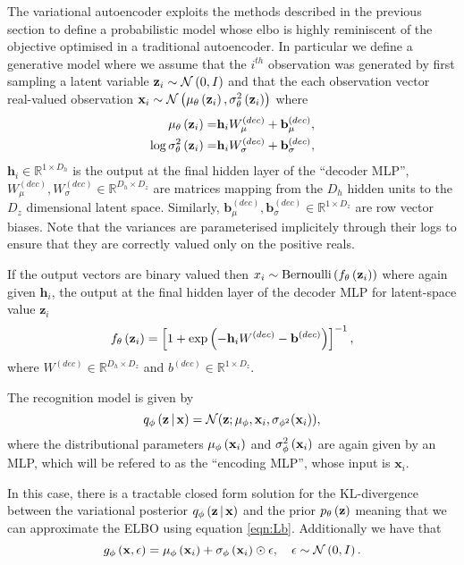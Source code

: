 \documentclass[../report.tex]{subfiles}
\begin{document}
The variational autoencoder exploits the methods described in the previous section to define a probabilistic model whose elbo is highly reminiscent of the objective optimised in a traditional autoencoder. In particular we define a generative model where we assume that the $i^{th}$ observation was generated by first sampling a latent variable $\mathbf{z}_i \sim \mathcal{N} \left( 0, I\right)$ and that the each observation vector real-valued observation $\mathbf{x}_i \sim \mathcal{N} \left( \mu_\theta \left( \mathbf{z}_i\right), \sigma^2_\theta \left( \mathbf{z}_i\right)\right)$ where
\begin{align}
  \mathbf{\mu}_\theta \left( \mathbf{z}_i\right) =& \mathbf{h}_i W_\mathbf{\mu}^{(dec)} + \mathbf{b}_\mathbf{\mu}^{(dec)}, \\
  \log \sigma^2_\theta \left( \mathbf{z}_i\right) =& \mathbf{h}_i W_\sigma^{(dec)} + \mathbf{b}_\sigma^{(dec)},
\end{align}
$\mathbf{h}_i \in \mathbb{R}^{1 \times D_h}$ is the output at the final hidden layer of the ``decoder MLP'', $W_\mu^{(dec)}, W_\sigma^{(dec)} \in \mathbb{R}^{D_h \times D_z}$ are matrices mapping from the $D_h$ hidden units to the $D_z$ dimensional latent space. Similarly, $\mathbf{b}_\mu^{(dec)}, \mathbf{b}_\sigma^{(dec)} \in \mathbb{R}^{1 \times D_z}$ are row vector biases. Note that the variances are parameterised implicitely through their logs to ensure that they are correctly valued only on the positive reals.

If the output vectors are binary valued then $x_i \sim \textrm{Bernoulli} \left( f_\theta \left( \mathbf{z}_i\right)\right)$ where again given $\mathbf{h}_i$, the output at the final hidden layer of the decoder MLP for latent-space value $\mathbf{z}_i$
\begin{equation}
  f_\theta \left( \mathbf{z}_i\right) = \left[1 + \exp \left( - \mathbf{h}_i W^{(dec)} - \mathbf{b}^{(dec)}\right) \right]^{-1},
\end{equation}
where $W^{(dec)} \in \mathbb{R}^{D_h \times D_z}$ and $b^{(dec)} \in \mathbb{R}^{1 \times D_z}$.

The recognition model is given by
\begin{equation}
  q_\phi \left(\mathbf{z} \, \middle\vert \, \mathbf{x} \right) = \mathcal{N}(\mathbf{z}; \mu_\phi, \mathbf{x}_i, \sigma_{\phi^2}(\mathbf{x}_i)),
\end{equation}
where the distributional parameters $\mu_\phi \left( \mathbf{x}_i\right)$ and $\sigma_\phi^2 \left( \mathbf{x}_i\right)$ are again given by an MLP, which will be refered to as the ``encoding MLP'', whose input is $\mathbf{x}_i$.

In this case, there is a tractable closed form solution for the KL-divergence between the variational posterior $q_\phi \left(\mathbf{z} \, \middle\vert \, \mathbf{x} \right)$ and the prior $p_\theta \left( \mathbf{z}\right)$ meaning that we can approximate the ELBO using equation \ref{eqn:Lb}. Additionally we have that
\begin{equation}
  g_\phi \left( \mathbf{x}, \epsilon\right) = \mu_\phi \left( \mathbf{x}_i\right) + \sigma_\phi \left( \mathbf{x}_i\right) \odot \epsilon, \quad \epsilon \sim \mathcal{N} \left( 0, I\right).
\end{equation}
\end{document}
